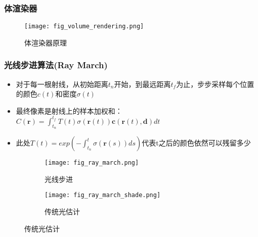\begin{frame}
    \frametitle{体渲染器}
    \begin{figure}
        \centering
        \texttt{[image: fig\_volume\_rendering.png]}
        \caption[short]{体渲染器原理}
    \end{figure}
\end{frame}
\begin{frame}
    \frametitle{光线步进算法(Ray March)}
    \begin{itemize}
        \item 对于每一根射线，从初始距离$t_n$开始，到最远距离$t_f$为止，步步采样每个位置的颜色$c(t)$和密度$\sigma(t)$
        \item 最终像素是射线上的样本加权和：$C(\mathbf{r})=\int_{t_n}^{t_f}T(t)\sigma(\mathbf{r}(t))\mathbf{c}(\mathbf{r}(t),\mathbf{d})dt$
        \item 此处$T(t)=exp(-\int_{t_n}^{t}\sigma(\mathbf{r}(s))ds)$代表t之后的颜色依然可以残留多少
    \end{itemize}
    \begin{figure}
        \begin{subfigure}{0.48\textwidth}
            \texttt{[image: fig\_ray\_march.png]}
            \caption[short]{光线步进}
        \end{subfigure}
        \begin{subfigure}{0.48\textwidth}
            \texttt{[image: fig\_ray\_march\_shade.png]}
            \caption[short]{传统光估计}
        \end{subfigure}
    \end{figure}
\end{frame}